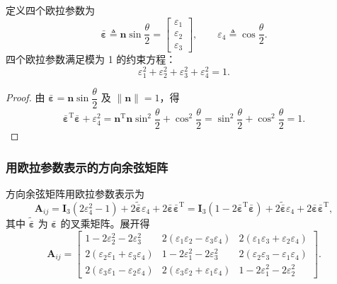 \begin{definition}[欧拉参数]\label{def:euler-params}
	定义四个欧拉参数为
	$$
	\bar{\boldsymbol{\varepsilon}}\triangleq\boldsymbol{n}\sin\frac{\theta}{2}=\begin{bmatrix}\varepsilon_1\\\varepsilon_2\\\varepsilon_3\end{bmatrix}, \qquad
	\varepsilon_4\triangleq\cos\frac{\theta}{2}.
	$$
	四个欧拉参数满足模为 1 的约束方程：
	$$
	\varepsilon_1^2+\varepsilon_2^2+\varepsilon_3^2+\varepsilon_4^2=1.
	$$
\end{definition}

\begin{proof}
	由 $\bar{\boldsymbol{\varepsilon}}=\boldsymbol{n}\sin\dfrac{\theta}{2}$ 及 $\|\boldsymbol{n}\|=1$，得
	$$
	\bar{\boldsymbol{\varepsilon}}^{\mathrm{T}}\bar{\boldsymbol{\varepsilon}}+\varepsilon_4^2
	=\boldsymbol{n}^{\mathrm{T}}\boldsymbol{n}\sin^2\frac{\theta}{2}+\cos^2\frac{\theta}{2}
	=\sin^2\frac{\theta}{2}+\cos^2\frac{\theta}{2}=1.
	$$
\end{proof}

\subsubsection{用欧拉参数表示的方向余弦矩阵}

\begin{theorem}[欧拉参数表示的方向余弦矩阵]\label{thm:dcm-euler-params}
	方向余弦矩阵用欧拉参数表示为
	$$
	\boldsymbol{A}_{ij}=\boldsymbol{I}_3(2\varepsilon_4^2-1)+2\tilde{\bar{\boldsymbol{\varepsilon}}}\varepsilon_4+2\bar{\boldsymbol{\varepsilon}}\bar{\boldsymbol{\varepsilon}}^{\mathrm{T}}
	=\boldsymbol{I}_3(1-2\bar{\boldsymbol{\varepsilon}}^{\mathrm{T}}\bar{\boldsymbol{\varepsilon}})+2\tilde{\bar{\boldsymbol{\varepsilon}}}\varepsilon_4+2\bar{\boldsymbol{\varepsilon}}\bar{\boldsymbol{\varepsilon}}^{\mathrm{T}},
	$$
	其中 $\tilde{\bar{\boldsymbol{\varepsilon}}}$ 为 $\bar{\boldsymbol{\varepsilon}}$ 的叉乘矩阵。展开得
	$$
	\boldsymbol{A}_{ij}=
	\begin{bmatrix}
		1-2\varepsilon_2^2-2\varepsilon_3^2 & 2(\varepsilon_1\varepsilon_2-\varepsilon_3\varepsilon_4) & 2(\varepsilon_1\varepsilon_3+\varepsilon_2\varepsilon_4)\\
		2(\varepsilon_2\varepsilon_1+\varepsilon_3\varepsilon_4) & 1-2\varepsilon_1^2-2\varepsilon_3^2 & 2(\varepsilon_2\varepsilon_3-\varepsilon_1\varepsilon_4)\\
		2(\varepsilon_3\varepsilon_1-\varepsilon_2\varepsilon_4) & 2(\varepsilon_3\varepsilon_2+\varepsilon_1\varepsilon_4) & 1-2\varepsilon_1^2-2\varepsilon_2^2
	\end{bmatrix}.
	$$
\end{theorem}

